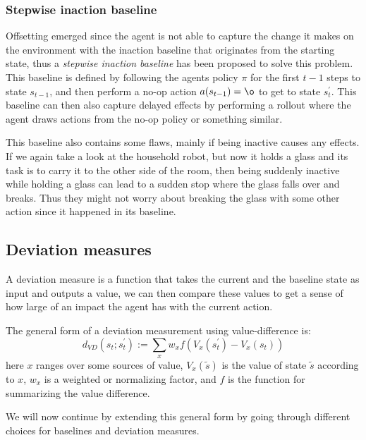 \documentclass[12pt,A4]{report}
\theoremstyle{definition}
\begin{document}
\subsubsection{Stepwise inaction baseline}
Offsetting emerged since the agent is not able to capture the change it makes on the environment with the inaction baseline that originates from the starting state, thus a \textit{stepwise inaction baseline} has been proposed to solve this problem. This baseline is defined by following the agents policy $\pi$ for the first $t-1$ steps to state $s_{t-1}$, and then perform a no-op action $a(s_{t-1}) = \o$ to get to state $s^\prime_t$. This baseline can then also capture delayed effects by performing a rollout where the agent draws actions from the no-op policy or something similar.  

This baseline also contains some flaws, mainly if being inactive causes any effects. If we again take a look at the household robot, but now it holds a glass and its task is to carry it to the other side of the room, then being suddenly inactive while holding a glass can lead to a sudden stop where the glass falls over and breaks. Thus they might not worry about breaking the glass with some other action since it happened in its baseline. 

\subsection{Deviation measures}
A deviation measure is a function that takes the current and the baseline state as input and outputs a value, we can then compare these values to get a sense of how large of an impact the agent has with the current action.

The general form of a deviation measurement using value-difference is:
  \[d_{VD}(s_t;s^{\prime}_t) := \sum_x w_x f(V_x(s^{\prime}_t) - V_x(s_t))\]
here $x$ ranges over some sources of value, $V_x(\tilde{s})$ is the value of state $\tilde{s}$ according to $x$, $w_x$ is a weighted or normalizing factor, and $f$ is the function for summarizing the value difference.

We will now continue by extending this general form by going through different choices for baselines and deviation measures.
\end{document}
